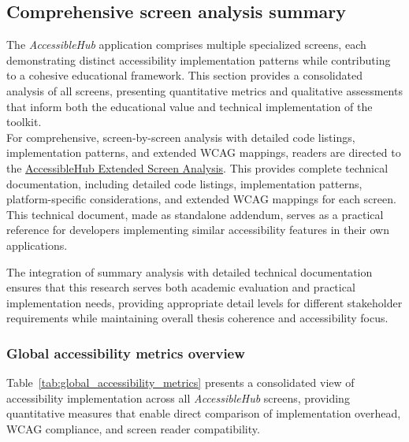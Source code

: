 \FloatBarrier 

\subsection{Comprehensive screen analysis summary}
\label{subsec:comprehensive-screen-analysis}

The \textit{AccessibleHub} application comprises multiple specialized screens, each demonstrating distinct accessibility implementation patterns while contributing to a cohesive educational framework. This section provides a consolidated analysis of all screens, presenting quantitative metrics and qualitative assessments that inform both the educational value and technical implementation of the toolkit. \\

For comprehensive, screen-by-screen analysis with detailed code listings, implementation patterns, and extended WCAG mappings, readers are directed to the \href{https://github.com/gabrielrovesti/AccessibleHub/blob/main/Technical\%20Thesis\%20Appendix/AccessibleHub\%20-\%20Extended\%20screen\%20analysis.pdf}{AccessibleHub Extended Screen Analysis}.
This provides complete technical documentation, including detailed code listings, implementation patterns, platform-specific considerations, and extended WCAG mappings for each screen. This technical document, made as standalone addendum, serves as a practical reference for developers implementing similar accessibility features in their own applications.

The integration of summary analysis with detailed technical documentation ensures that this research serves both academic evaluation and practical implementation needs, providing appropriate detail levels for different stakeholder requirements while maintaining overall thesis coherence and accessibility focus.

\subsubsection{Global accessibility metrics overview}
\label{subsubsec:global-metrics-overview}

Table~\ref{tab:global_accessibility_metrics} presents a consolidated view of accessibility implementation across all \textit{AccessibleHub} screens, providing quantitative measures that enable direct comparison of implementation overhead, WCAG compliance, and screen reader compatibility.

